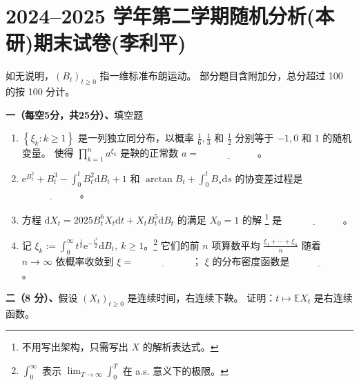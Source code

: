 

\section{2024--2025 学年第二学期随机分析(本研)期末试卷(李利平)}



\quad 如无说明，$\left(B_{t}\right)_{t \geq 0}$ 指一维标准布朗运动。
部分题目含附加分，总分超过 100 的按 100 分计。

\textbf{一（每空5分，共25分）、}填空题
\begin{enumerate}[label=(\arabic*)]
\item $\left\{\xi_{k}: k \geq 1\right\}$ 是一列独立同分布，以概率 $\frac{1}{6}, \frac{1}{3}$ 和 $\frac{1}{2}$ 分别等于 $-1,0$ 和 $1$ 的随机变量。
使得 $\prod_{k=1}^{n} a^{\xi_{k}}$ 是鞅的正常数 $a=\underline{\qquad\qquad\qquad}$。

\item $\mathrm{e}^{B_{t}^{2}}+B_{t}^{3}-\int_{0}^{t} B_{t}^{2} \mathrm{d} B_{t}+1$ 和 $\arctan B_{t}+\int_{0}^{t} B_{s} \mathrm{d} s$ 的协变差过程是 $\underline{\qquad\qquad\qquad}$。

\item 方程 $\mathrm{d} X_{t}=2025 B_{t}^{6} X_{t} \mathrm{d} t+X_{t} B_{t}^{5} \mathrm{d} B_{t}$ 的满足 $X_{0}=1$ 的解 \footnote{不用写出架构，只需写出 $X$ 的解析表达式。} 是 $\underline{\qquad\qquad\qquad}$。

\item 记 $\xi_{k}:=\int_{0}^{\infty} t^{\frac{1}{k}} \mathrm{e}^{-\frac{t^{2}}{2}} \mathrm{d} B_{t},\ k \geq 1$。\footnote{$\int_{0}^{\infty}$ 表示 $\lim_{T \rightarrow \infty} \int_{0}^{T}$ 在 a.s. 意义下的极限。} 
它们的前 $n$ 项算数平均 $\frac{\xi_{1}+\cdots+\xi_{n}}{n}$ 随着 $n \rightarrow \infty$ 依概率收敛到 $\xi=\underline{\qquad\qquad\qquad}$；
$\xi$ 的分布密度函数是$\underline{\qquad\qquad\qquad}$。
\end{enumerate}

\printfootnotes



\textbf{二（8 分）、}假设 $\left(X_{t}\right)_{t \geq 0}$ 是连续时间，右连续下鞅。
证明：$t \mapsto \mathbb{E} X_{t}$ 是右连续函数。


